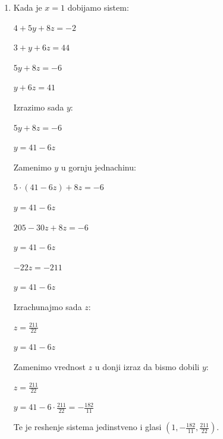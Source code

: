 \documentclass[a4paper,12pt]{article}
\begin{document}
\begin{enumerate}[1.]
\begin{enumerate}[1)]
\item Kada je $x = 1$ dobijamo sistem:
\begin{center}
\par $4 + 5y +8z = -2$
\par $3 + y + 6z = 44$
\end{center}
\begin{center}
\par $5y +8z = -6$
\par $y + 6z = 41$
\end{center}
\par Izrazimo sada $y$:
\begin{center}
\par $5y +8z = -6$
\par $y = 41 - 6z$
\end{center}
\par Zamenimo $y$ u gornju jednachinu:
\begin{center}
\par $5 \cdot (41 - 6z) +8z = -6$
\par $y = 41 - 6z$
\end{center}
\begin{center}
\par $205 -30z +8z = -6$
\par $y = 41 - 6z$
\end{center}
\begin{center}
\par $-22z = -211$
\par $y = 41 - 6z$
\end{center}
\par Izrachunajmo sada $z$:
\begin{center}
\par $z = \frac{211}{22}$
\par $y = 41 - 6z$
\end{center}
\par Zamenimo vrednost $z$ u donji izraz da bismo dobili $y$:
\begin{center}
\par $z = \frac{211}{22}$
\par $y = 41 - 6 \cdot \frac{211}{22} = - \frac{182}{11}  $
\end{center}
\par Te je reshenje sistema jedinstveno i glasi $(1,-\frac{182}{11}, \frac{211}{22})$.


\end{enumerate}
\end{enumerate}
\end{document}
